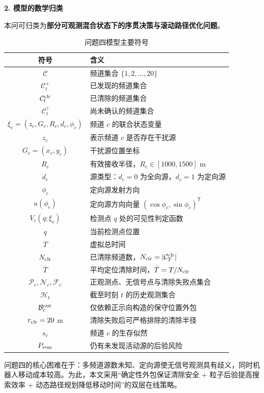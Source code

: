 \documentclass[zihao=-4,a4paper,UTF8,fontset=none]{ctexart}
\begin{document}
\noindent\textbf{2. 模型的数学归类}

本问可归类为\textbf{部分可观测混合状态下的序贯决策与滚动路径优化问题}。

\begin{table}[H]
\centering
\caption{问题四模型主要符号}
\label{tab:q4_symbols}
\begin{tabular}{cl}
\toprule
符号 & 含义 \\
\midrule
$\mathcal C$ & 频道集合 $\{1,2,\ldots,20\}$ \\
$\mathcal C_t^{+}$ & 已发现的频道集合 \\
$\mathcal C_t^{\rm clr}$ & 已清除的频道集合 \\
$\mathcal C_t^{?}$ & 尚未确认的频道集合 \\
$\xi_c=(z_c,G_c,R_c,d_c,\phi_c)$ & 频道 $c$ 的联合状态变量 \\
$z_c$ & 表示频道 $c$ 是否存在干扰源 \\
$G_c=(x_c,y_c)$ & 干扰源位置坐标 \\
$R_c$ & 有效接收半径，$R_c\in[1000,1500]$ m \\
$d_c$ & 源类型：$d_c=0$ 为全向源，$d_c=1$ 为定向源 \\
$\phi_c$ & 定向源发射方向 \\
$u(\phi_c)$ & 定向源方向向量 $(\cos\phi_c,\sin\phi_c)^{\mathsf T}$ \\
$V_c(q;\xi_c)$ & 检测点 $q$ 处的可见性判定函数 \\
$q$ & 当前检测点位置 \\
$T$ & 虚拟总时间 \\
$N_{\rm clr}$ & 已清除频道数，$N_{\rm clr}=|\mathcal C_T^{\rm clr}|$ \\
$\bar T$ & 平均定位清除时间，$\bar T=T/N_{\rm clr}$ \\
$\mathcal P_c,\mathcal N_c,\mathcal F_c$ & 正观测点、无信号点与清除失败点集合 \\
$\mathcal H_t$ & 截至时刻 $t$ 的历史观测集合 \\
$\mathcal B_c^{\rm out}$ & 仅依赖正示向构造的保守位置外包 \\
$r_{\rm clr}=20$ m & 清除失败后可严格排除的清除半径 \\
$s_c$ & 频道 $c$ 的生存似然 \\
$P_{\rm rem}$ & 仍有未发现活动源的后验风险 \\
\bottomrule
\end{tabular}
\end{table}

问题四的核心困难在于：多频道源数未知、定向源使无信号观测具有歧义，同时机器人移动成本较高。为此，本文采用“确定性外包保证清除安全 + 粒子后验提高搜索效率 + 动态路径规划降低移动时间”的双层在线策略。
\end{document}
